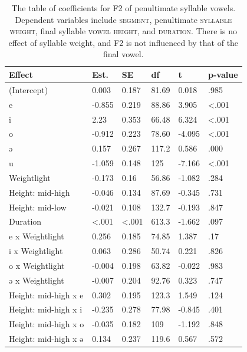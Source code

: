 \documentclass[12pt]{ouparticle}
\begin{document}
\begin{table}[h!]
\centering
\caption{The table of coefficients for F2 of penultimate syllable vowels. Dependent variables include \textsc{segment}, penultimate \textsc{syllable weight}, final syllable \textsc{vowel height}, and \textsc{duration}. There is no effect of syllable weight, and F2 is not influenced by that of the final vowel.}
\label{tab:Syll2f2_harmony}
\renewcommand{\arraystretch}{0.5}%
\begin{tabular}{l | l l l l l}
Effect & Est. & SE & df & t & p-value\\
\hline
(Intercept)          &  0.003  & 0.187  & 81.69    & 0.018   & .985\\
e                    &  -0.855 & 0.219  & 88.86    &   3.905 & <.001\\
i                    &  2.23   & 0.353  & 66.48    & 6.324  & <.001\\
o                    &  -0.912 & 0.223  & 78.60    & -4.095  & <.001\\
ə                    &   0.157 & 0.267  & 117.2    &  0.586  & .000 \\
u                    &  -1.059 & 0.148  & 125      & -7.166 & <.001\\
Weightlight          &  -0.173 & 0.16   & 56.86    & -1.082  & .284     \\ 
Height: mid-high     &  -0.046 & 0.134  & 87.69    & -0.345  & .731    \\
Height: mid-low      &  -0.021 & 0.108  & 132.7    & -0.193  & .847    \\
Duration             &  <.001  & <.001  & 613.3    & -1.662  & .097 \\
e x Weightlight      &   0.256 & 0.185  & 74.85    &  1.387  & .17 \\ 
i x Weightlight      &   0.063 & 0.286  & 50.74    &  0.221  & .826    \\
o x Weightlight      &  -0.004 & 0.198  & 63.82    & -0.022  & .983    \\
ə x Weightlight      &  -0.007 & 0.204  & 92.76    &  0.323  & .747  \\
Height: mid-high x e &   0.302 & 0.195  & 123.3    &  1.549  & .124 \\
Height: mid-high x i &  -0.235 & 0.278  & 77.98    & -0.845  & .401  \\  
Height: mid-high x o &  -0.035 & 0.182  & 109      & -1.192  & .848 \\
Height: mid-high x ə &   0.134 & 0.237  & 119.6    &  0.567  & .572   \\

\end{tabular}
\end{table}
\end{document}
